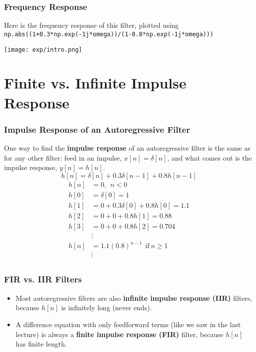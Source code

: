 \documentclass{beamer}
\begin{document}
\begin{frame}
  \frametitle{Frequency Response}

  Here is the frequency response of this filter, plotted using {\tt
    np.abs((1+0.3*np.exp(-1j*omega))/(1-0.8*np.exp(-1j*omega)))}
  
  \centerline{\texttt{[image: exp/intro.png]}}
\end{frame}

\section[FIR and IIR]{Finite vs. Infinite Impulse Response}
\setcounter{subsection}{1}

\begin{frame}
  \frametitle{Impulse Response of an Autoregressive Filter}

  One way to find the {\bf impulse response} of an autoregressive
  filter is the same as for any other filter: feed in an impulse,
  $x[n]=\delta[n]$, and what comes out is the impulse response,
  $y[n]=h[n]$.
  \[
  h[n] = \delta[n] + 0.3\delta[n-1] + 0.8 h[n-1]
  \]
  \begin{align*}
    h[n] &= 0,~~n<0\\
    h[0] &= \delta[0] = 1\\
    h[1] &= 0 + 0.3\delta[0] + 0.8 h[0] = 1.1\\
    h[2] &= 0 + 0 + 0.8 h[1] = 0.88\\
    h[3] &= 0+ 0 + 0.8 h[2] = 0.704\\
    & \vdots\\
    h[n] &= 1.1(0.8)^{n-1}~~\mbox{if}~n\ge 1\\
    & \vdots\\
  \end{align*}
\end{frame}

\begin{frame}
  \frametitle{FIR vs. IIR Filters}

  \begin{itemize}
  \item Most autoregressive filters are also {\bf infinite
    impulse response (IIR)} filters, because $h[n]$ is infinitely long
    (never ends).
  \item A difference equation with only feedforward terms (like we saw
    in the last lecture) is always a {\bf finite impulse response
      (FIR)} filter, because $h[n]$ has finite length.
  \end{itemize}
\end{frame}
\end{document}
